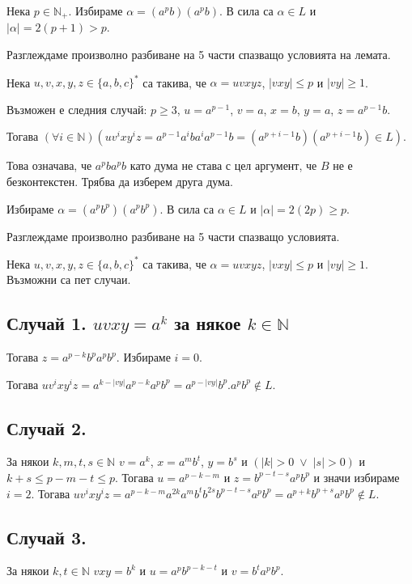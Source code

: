 \documentclass[12pt]{article}
\begin{document}
Нека \(p \in \mathbb{N}_+\). Избираме \(\alpha = (a^pb)(a^pb)\). В сила са \(\alpha \in L\) и \(|\alpha| = 2(p + 1) > p\).

Разглеждаме произволно разбиване на 5 части спазващо условията на лемата.

Нека \(u, v, x, y, z \in \{a, b, c\}^*\) са такива, че \(\alpha = uvxyz\), \(|vxy| \leq p\) и \(|vy| \geq 1\).

Възможен е следния случай: \(p \geq 3\), \(u = a^{p - 1}\), \(v = a\), \(x = b\), \(y = a\), \(z = a^{p - 1}b\).

Тогава \((\forall i \in \mathbb N)(uv^ixy^iz = a^{p - 1}a^iba^ia^{p - 1}b = (a^{p + i - 1}b)(a^{p + i - 1}b) \in L)\).

Това означава, че \(a^pba^pb\) като дума не става с цел аргумент, че \(B\) не е безконтекстен. Трябва да изберем друга дума.

Избираме \(\alpha = (a^pb^p)(a^pb^p)\). В сила са \(\alpha \in L\) и \(|\alpha| = 2(2p) \geq p\).

Разглеждаме произволно разбиване на 5 части спазващо условията.

Нека \(u, v, x, y, z \in \{a, b, c\}^*\) са такива, че \(\alpha = uvxyz\), \(|vxy| \leq p\) и \(|vy| \geq 1\).
Възможни са пет случаи.

\subsection*{Случай 1. \(uvxy = a^k\) за някое \(k \in \mathbb N\)}
Тогава \(z = a^{p - k}b^pa^pb^p\). Избираме \(i = 0\).

Тогава \(uv^ixy^iz = a^{k - |vy|}a^{p - k}a^pb^p = a^{p - |vy|}b^p.a^pb^p \notin L\).

\subsection*{Случай 2.}
За някои \(k, m, t, s \in \mathbb N\) \(v = a^k\), \(x = a^mb^t\), \(y = b^s\) и \((|k| > 0 \;\lor\; |s| > 0)\) и
\(k + s \leq p - m - t \leq p\). Тогава \(u = a^{p - k - m}\) и \(z = b^{p - t - s}a^pb^p\) и значи избираме \(i = 2\). Тогава \(uv^ixy^iz = a^{p - k - m}a^{2k}a^mb^tb^{2s}b^{p - t - s }a^pb^p = a^{p + k}b^{p + s}a^pb^p \notin L\).

\subsection*{Случай 3.}
За някои \(k, t \in \mathbb N\) \(vxy = b^k\) и \(u = a^pb^{p - k - t}\) и \(v = b^ta^pb^p\).
\end{document}
